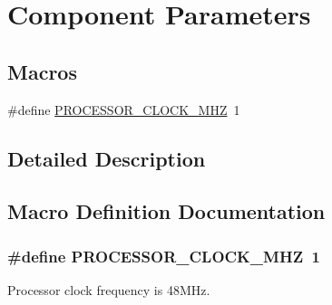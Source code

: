 \hypertarget{group___cmp_para}{\section{Component Parameters}
\label{group___cmp_para}
}
\subsection*{Macros}
\begin{DoxyCompactItemize}
\item 
\#define \hyperlink{group___cmp_para_gaf655be6b08c751c0c8ba2f66b3a55632}{P\-R\-O\-C\-E\-S\-S\-O\-R\-\_\-\-C\-L\-O\-C\-K\-\_\-M\-H\-Z}~1
\end{DoxyCompactItemize}


\subsection{Detailed Description}


\subsection{Macro Definition Documentation}
\hypertarget{group___cmp_para_gaf655be6b08c751c0c8ba2f66b3a55632}{
\subsubsection[{P\-R\-O\-C\-E\-S\-S\-O\-R\-\_\-\-C\-L\-O\-C\-K\-\_\-48\-M\-H\-Z}]{\setlength{\rightskip}{0pt plus 5cm}\#define P\-R\-O\-C\-E\-S\-S\-O\-R\-\_\-\-C\-L\-O\-C\-K\-\_\-M\-H\-Z~1}}\label{group___cmp_para_gaf655be6b08c751c0c8ba2f66b3a55632}
Processor clock frequency is 48\-M\-Hz. 